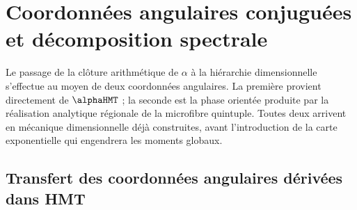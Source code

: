 \chapter{Coordonnées angulaires conjuguées et décomposition spectrale}
\label{chap:canales}

Le passage de la clôture arithmétique de \(\alpha\) à la hiérarchie
dimensionnelle s'effectue au moyen de deux coordonnées angulaires. La première provient
directement de \(\alphaHMT\) ; la seconde est la phase orientée produite par
la réalisation analytique régionale de la microfibre quintuple. Toutes deux arrivent en
mécanique dimensionnelle déjà construites, avant l'introduction de la carte exponentielle
qui engendrera les moments globaux.

\section{Transfert des coordonnées angulaires dérivées dans HMT}

